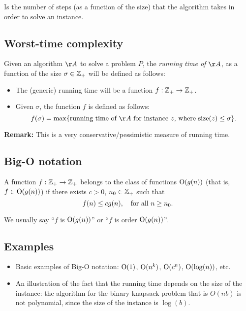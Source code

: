 \documentclass[../open-optimization/open-optimization.tex]{subfiles}
\begin{document}
	
\begin{definition}
Is the number of steps (as a function of the size) that the algorithm takes in order to solve an instance. 
\end{definition}


	
	

\subsection{Worst-time complexity}	

Given an algorithm $\AA$ to solve a problem $P$, the {\em running time of $\AA$}, as a function of the size $\sigma\in{\mathbb{Z}}_+$ will be defined as follows:
\begin{itemize}
	\item The (generic) running time will be a function $f:{\mathbb{Z}}_+\rightarrow{\mathbb{Z}}_+$.
   \item Given $\sigma$, the function $f$ is defined as follows:
		$$f(\sigma)=\max\{\textup{running time of $\AA$ for instance $z$, where $\size(z)\leq \sigma$}\}.$$
\end{itemize}
	
{\bf Remark:} This is a very conservative/pessimistic measure of running time.	
\subsection{Big-O notation}

A function 	$f:{\mathbb{Z}}_+\rightarrow{\mathbb{Z}}_+$ belongs to the class of functions $\textup{O}(g(n))$ (that is, $f\in\textup{O}(g(n))$) if there exists $c>0$, $n_0\in{\mathbb{Z}}_+$ such that
$$f(n)\leq c g(n),\quad \textup{for all}\ n\geq n_0.$$

We usually say ``$f$ is $\textup{O}(g(n))$'' or ``$f$ is order $\textup{O}(g(n))$''.
	\subsection{Examples} 
\begin{itemize}
  \item Basic examples of Big-O notation: $\textup{O}(1)$, $\textup{O}(n^k)$, $\textup{O}(c^n)$, $\textup{O}(\log(n))$, etc.
	\item An illustration of the fact that the running time depends on the size of the instance: the algorithm for the binary knapsack problem that is $O(nb)$ is not polynomial, since the size of the instance is $\log(b)$.
\end{itemize}	
 
\end{document}
